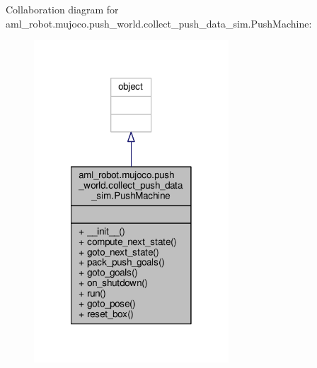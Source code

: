 Collaboration diagram for aml\-\_\-robot.\-mujoco.\-push\-\_\-world.\-collect\-\_\-push\-\_\-data\-\_\-sim.\-Push\-Machine\-:\nopagebreak
\begin{figure}[H]
\begin{center}
\leavevmode
\includegraphics[width=206pt]{classaml__robot_1_1mujoco_1_1push__world_1_1collect__push__data__sim_1_1_push_machine__coll__graph}
\end{center}
\end{figure}

